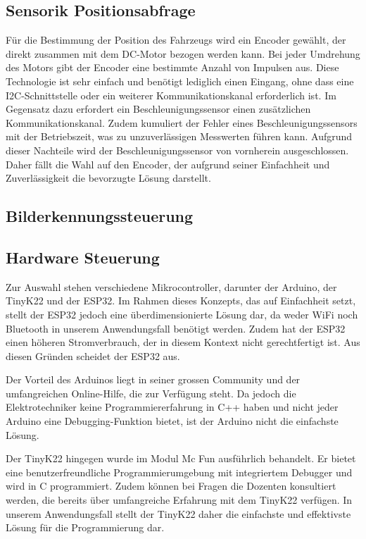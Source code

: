 \documentclass[../main.tex]{subfiles}
\begin{document}
\subsection{Sensorik Positionsabfrage}
Für die Bestimmung der Position des Fahrzeugs wird ein Encoder gewählt, der direkt zusammen mit dem DC-Motor bezogen werden kann. Bei jeder Umdrehung des Motors gibt der Encoder eine bestimmte Anzahl von Impulsen aus. Diese Technologie ist sehr einfach und benötigt lediglich einen Eingang, ohne dass eine I2C-Schnittstelle oder ein weiterer Kommunikationskanal erforderlich ist. Im Gegensatz dazu erfordert ein Beschleunigungssensor einen zusätzlichen Kommunikationskanal. Zudem kumuliert der Fehler eines Beschleunigungssensors mit der Betriebszeit, was zu unzuverlässigen Messwerten führen kann. Aufgrund dieser Nachteile wird der Beschleunigungssensor von vornherein ausgeschlossen. Daher fällt die Wahl auf den Encoder, der aufgrund seiner Einfachheit und Zuverlässigkeit die bevorzugte Lösung darstellt.


\subsection{Bilderkennungssteuerung}



\subsection{Hardware Steuerung}
Zur Auswahl stehen verschiedene Mikrocontroller, darunter der Arduino, der TinyK22 und der ESP32. Im Rahmen dieses Konzepts, das auf Einfachheit setzt, stellt der ESP32 jedoch eine überdimensionierte Lösung dar, da weder WiFi noch Bluetooth in unserem Anwendungsfall benötigt werden. Zudem hat der ESP32 einen höheren Stromverbrauch, der in diesem Kontext nicht gerechtfertigt ist. Aus diesen Gründen scheidet der ESP32 aus.

Der Vorteil des Arduinos liegt in seiner grossen Community und der umfangreichen Online-Hilfe, die zur Verfügung steht. Da jedoch die Elektrotechniker keine Programmiererfahrung in C++ haben und nicht jeder Arduino eine Debugging-Funktion bietet, ist der Arduino nicht die einfachste Lösung.

Der TinyK22 hingegen wurde im Modul Mc Fun ausführlich behandelt. Er bietet eine benutzerfreundliche Programmierumgebung mit integriertem Debugger und wird in C programmiert. Zudem können bei Fragen die Dozenten konsultiert werden, die bereits über umfangreiche Erfahrung mit dem TinyK22 verfügen. In unserem Anwendungsfall stellt der TinyK22 daher die einfachste und effektivste Lösung für die Programmierung dar.
\end{document}
